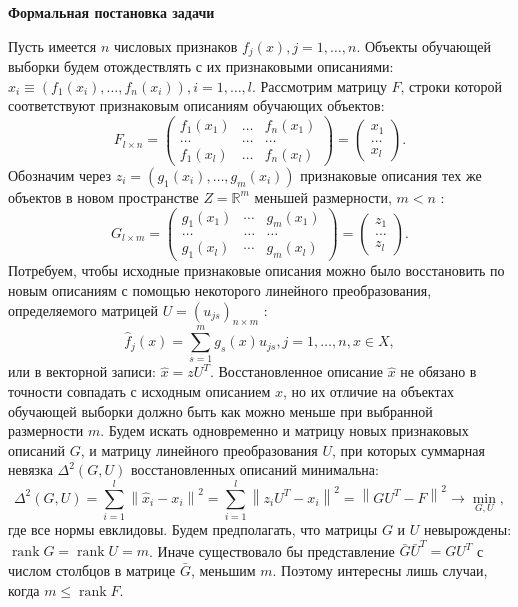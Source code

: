 {}\documentclass{article}
\begin{document}
\textbf{Формальная постановка задачи}

Пусть имеется $n$ числовых признаков $f_j(x), j=1, \ldots, n$.
Объекты обучающей выборки будем отождествлять с их признаковыми описаниями:
$x_i \equiv\left(f_1\left(x_i\right), \ldots, f_n\left(x_i\right)\right), i=1, \ldots, l$. Рассмотрим матрицу $F$, строки которой соответствуют признаковым описаниям обучающих объектов:
\[
F_{l \times n}=\left(\begin{array}{ccc}
f_1\left(x_1\right) & \ldots & f_n\left(x_1\right) \\
\ldots & \ldots & \ldots \\
f_1\left(x_l\right) & \ldots & f_n\left(x_l\right)
\end{array}\right)=\left(\begin{array}{c}
x_1 \\
\ldots \\
x_l
\end{array}\right) .
\]
Обозначим через $z_i=\left(g_1\left(x_i\right), \ldots, g_m\left(x_i\right)\right)$ признаковые описания тех же объектов в новом пространстве $Z=\mathbb{R}^m$ меньшей размерности, $m<n$ :
\[
G_{l \times m}=\left(\begin{array}{ccc}
g_1\left(x_1\right) & \cdots & g_m\left(x_1\right) \\
\ldots & \ldots & \ldots \\
g_1\left(x_l\right) & \cdots & g_m\left(x_l\right)
\end{array}\right)=\left(\begin{array}{c}
z_1 \\
\ldots \\
z_l
\end{array}\right) .
\]
Потребуем, чтобы исходные признаковые описания можно было восстановить по новым описаниям с помощью некоторого линейного преобразования, определяемого матрицей $U=\left(u_{j s}\right)_{n \times m}$ :
\[
\hat{f}_j(x)=\sum_{s=1}^m g_s(x) u_{j s}, j=1, \ldots, n, x \in X,
\]
или в векторной записи: $\hat{x}=z U^T$. Восстановленное описание $\hat{x}$ не обязано в точности совпадать с исходным описанием $x$, но их отличие на объектах обучающей выборки должно быть как можно меньше при выбранной размерности $m$. Будем искать одновременно и матрицу новых признаковых описаний $G$, и матрицу линейного преобразования $U$, при которых суммарная невязка $\Delta^2(G, U)$ восстановленных описаний минимальна:
\[
\Delta^2(G, U)=\sum_{i=1}^l\left\|\hat{x}_i-x_i\right\|^2=\sum_{i=1}^l\left\|z_i U^T-x_i\right\|^2=\left\|G U^T-F\right\|^2 \rightarrow \min _{G, U},
\]
где все нормы евклидовы.
Будем предполагать, что матрицы $G$ и $U$ невырождены: $\operatorname{rank} G=\operatorname{rank} U=m$.
Иначе существовало бы представление $\bar{G} \bar{U}^T=G U^T$ с числом столбцов в матрице $\bar{G}$, меньшим $m$.
Поэтому интересны лишь случаи, когда $m \leq \operatorname{rank} F$.
\end{document}
